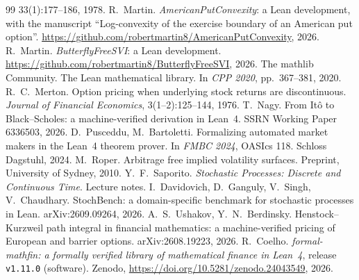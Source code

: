 \documentclass[11pt]{article}
\begin{document}
\begin{thebibliography}{99}
  33(1):177--186, 1978.
 R.~Martin. \emph{AmericanPutConvexity}: a Lean development, with the manuscript ``Log-convexity of the
  exercise boundary of an American put option''. \url{https://github.com/robertmartin8/AmericanPutConvexity}, 2026.
 R.~Martin. \emph{ButterflyFreeSVI}: a Lean development. \url{https://github.com/robertmartin8/ButterflyFreeSVI},
  2026.
 The mathlib Community. The Lean mathematical library. In \emph{CPP 2020}, pp.~367--381, 2020.
 R.~C.~Merton. Option pricing when underlying stock returns are discontinuous. \emph{Journal of Financial
  Economics}, 3(1--2):125--144, 1976.
 T.~Nagy. From It\^o to Black--Scholes: a machine-verified derivation in Lean~4. SSRN Working Paper 6336503, 2026.
 D.~Pusceddu, M.~Bartoletti. Formalizing automated market makers in the Lean~4 theorem prover. In
  \emph{FMBC 2024}, OASIcs 118. Schloss Dagstuhl, 2024.
 M.~Roper. Arbitrage free implied volatility surfaces. Preprint, University of Sydney, 2010.
 Y.~F.~Saporito. \emph{Stochastic Processes: Discrete and Continuous Time}. Lecture notes.
 I.~Davidovich, D.~Ganguly, V.~Singh, V.~Chaudhary. StochBench: a domain-specific benchmark for stochastic
  processes in Lean. arXiv:2609.09264, 2026.
 A.~S.~Ushakov, Y.~N.~Berdinsky. Henstock--Kurzweil path integral in financial mathematics: a
  machine-verified pricing of European and barrier options. arXiv:2608.19223, 2026.
 R.~Coelho. \emph{formal-mathfin: a formally verified library of mathematical finance in Lean~4}, release
  \texttt{v1.11.0} (software). Zenodo, \url{https://doi.org/10.5281/zenodo.24043549}, 2026.
\end{thebibliography}
\end{document}
